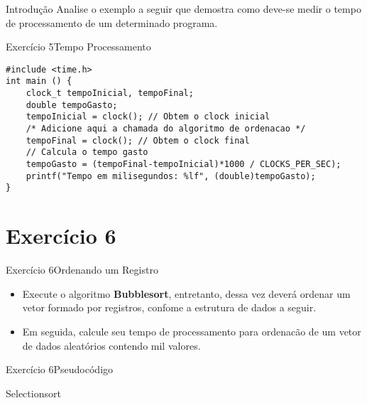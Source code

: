 \documentclass[aspectratio=169]{beamer}
\begin{document}
\begin{frame}{Introdução}
Analise o exemplo a seguir que demostra como deve-se medir o tempo de processamento de um determinado programa. 
\end{frame}


\begin{frame}[fragile]{Exercício 5}{Tempo Processamento}
\begin{lstlisting}[style=CStyle]
#include <time.h>
int main () {
    clock_t tempoInicial, tempoFinal;
    double tempoGasto;
    tempoInicial = clock(); // Obtem o clock inicial
    /* Adicione aqui a chamada do algoritmo de ordenacao */
    tempoFinal = clock(); // Obtem o clock final
    // Calcula o tempo gasto
    tempoGasto = (tempoFinal-tempoInicial)*1000 / CLOCKS_PER_SEC); 
    printf("Tempo em milisegundos: %lf", (double)tempoGasto);
}
\end{lstlisting}
\end{frame}

\section{Exercício 6}

\begin{frame}[fragile]{Exercício 6}{Ordenando um Registro}
\begin{itemize}
\item Execute o algoritmo {\bf Bubblesort}, entretanto, dessa vez deverá ordenar um vetor formado por registros, confome a estrutura de dados a seguir. 
\item Em seguida, calcule seu tempo de processamento para ordenacão de um vetor de dados aleatórios contendo mil valores.
\end{itemize}
\end{frame}


\begin{frame}[fragile]{Exercício 6}{Pseudocódigo}
\begin{algorithm}[H]
\caption{Selectionsort} 
\label{SelectionSort}
\end{algorithm}
\end{frame}
\end{document}
